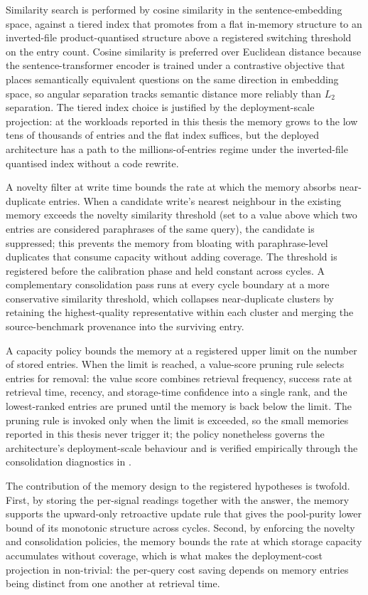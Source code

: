 Similarity search is performed by cosine similarity in the sentence-embedding space, against a tiered index that promotes from a flat in-memory structure to an inverted-file product-quantised structure above a registered switching threshold on the entry count. Cosine similarity is preferred over Euclidean distance because the sentence-transformer encoder is trained under a contrastive objective that places semantically equivalent questions on the same direction in embedding space, so angular separation tracks semantic distance more reliably than $L_2$ separation. The tiered index choice is justified by the deployment-scale projection: at the workloads reported in this thesis the memory grows to the low tens of thousands of entries and the flat index suffices, but the deployed architecture has a path to the millions-of-entries regime under the inverted-file quantised index without a code rewrite.

A novelty filter at write time bounds the rate at which the memory absorbs near-duplicate entries. When a candidate write's nearest neighbour in the existing memory exceeds the novelty similarity threshold (set to a value above which two entries are considered paraphrases of the same query), the candidate is suppressed; this prevents the memory from bloating with paraphrase-level duplicates that consume capacity without adding coverage. The threshold is registered before the calibration phase and held constant across cycles. A complementary consolidation pass runs at every cycle boundary at a more conservative similarity threshold, which collapses near-duplicate clusters by retaining the highest-quality representative within each cluster and merging the source-benchmark provenance into the surviving entry.

A capacity policy bounds the memory at a registered upper limit on the number of stored entries. When the limit is reached, a value-score pruning rule selects entries for removal: the value score combines retrieval frequency, success rate at retrieval time, recency, and storage-time confidence into a single rank, and the lowest-ranked entries are pruned until the memory is back below the limit. The pruning rule is invoked only when the limit is exceeded, so the small memories reported in this thesis never trigger it; the policy nonetheless governs the architecture's deployment-scale behaviour and is verified empirically through the consolidation diagnostics in .

The contribution of the memory design to the registered hypotheses is twofold. First, by storing the per-signal readings together with the answer, the memory supports the upward-only retroactive update rule that gives the pool-purity lower bound of  its monotonic structure across cycles. Second, by enforcing the novelty and consolidation policies, the memory bounds the rate at which storage capacity accumulates without coverage, which is what makes the deployment-cost projection in  non-trivial: the per-query cost saving depends on memory entries being distinct from one another at retrieval time.

